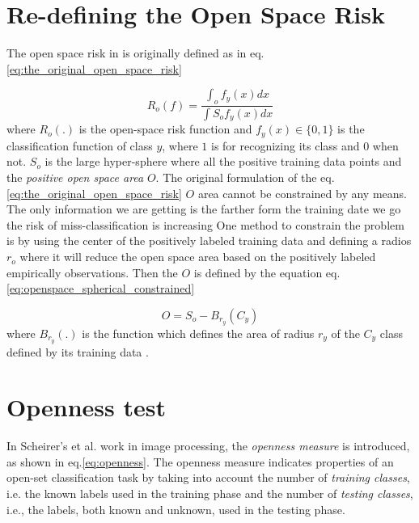 \section{Re-defining the Open Space Risk}\label{chap:eval_mentods:sec:open_space_risk} 

The open space risk in \cite{scheirer2013toward} is originally defined as in eq. \ref{eq:the_original_open_space_risk}

\begin{equation}\label{eq:the_origina_open_space_risk}
	R_{o}(f) = \frac{\int_{o} f_{y}(x) dx}{\int{S_{o}}  f_{y}(x) dx}
\end{equation}
where $R_{o}(.)$ is the open-space risk function and $f_{y}(x)  \in \{0, 1\}$ is the classification function of class $y$, where $1$ is for recognizing its class and $0$ when not. $S_{o}$ is the large hyper-sphere where all the positive training data points and the \textit{positive open space area} $O$. 
The original formulation of the eq. \ref{eq:the_original_open_space_risk} $O$ area cannot be constrained by any means. The only information we are getting is the farther form the training date we go the risk of miss-classification is increasing One method to constrain the problem is by using the center of the positively labeled training data and defining a radios $r_{o}$ where it will reduce the open space area based on the positively labeled empirically observations. Then the $O$ is defined by the equation eq. \ref{eq:openspace_spherical_constrained}

\begin{equation}\label{eq:openspace_spherical_constrained}
	O = S_{o} - B_{r_{y}}(C_{y})
\end{equation}
where $B_{r_{y}}(.)$ is the function which defines the area of radius $r_{y}$ of the $C_{y}$ class defined by its training data \parencite{fei2016breaking}.

\section{Openness test}\label{chap:eval_mentods:sec:open_space_risk}

In Scheirer's et al. \citep{scheirer2013toward} work in image processing, the \textit{openness measure} is introduced, as shown in eq.\ref{eq:openness}. The openness measure indicates properties of an open-set classification task by taking into account the number of \textit{training classes}, i.e. the known labels used in the training phase and the number of \textit{testing classes}, i.e., the labels, both known and unknown, used in the testing phase.

